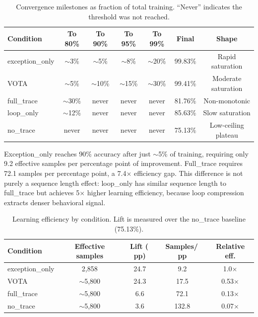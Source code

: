 \documentclass[11pt,a4paper]{article}
\newcommand{\pp}{\,pp}
\begin{document}
\begin{table}[t]
\centering
\caption{Convergence milestones as fraction of total training. ``Never'' indicates the threshold was not reached.}
\label{tab:dynamics}
\small
\begin{tabular}{@{}lcccccc@{}}
\toprule
Condition & To 80\% & To 90\% & To 95\% & To 99\% & Final & Shape \\
\midrule
exception\_only & $\sim$3\% & $\sim$5\% & $\sim$8\%  & $\sim$20\% & 99.83\% & Rapid saturation \\
VOTA            & $\sim$5\% & $\sim$10\% & $\sim$15\% & $\sim$30\% & 99.41\% & Moderate saturation \\
full\_trace     & $\sim$30\% & never & never & never & 81.76\% & Non-monotonic \\
loop\_only      & $\sim$12\% & never & never & never & 85.63\% & Slow saturation \\
no\_trace       & never & never & never & never & 75.13\% & Low-ceiling plateau \\
\bottomrule
\end{tabular}
\end{table}

Exception\_only reaches 90\% accuracy after just $\sim$5\% of training, requiring only 9.2 effective samples per percentage point of improvement. Full\_trace requires 72.1 samples per percentage point, a 7.4$\times$ efficiency gap. This difference is not purely a sequence length effect: loop\_only has similar sequence length to full\_trace but achieves 5$\times$ higher learning efficiency, because loop compression extracts denser behavioral signal.

\begin{table}[t]
\centering
\caption{Learning efficiency by condition. Lift is measured over the no\_trace baseline (75.13\%).}
\label{tab:efficiency}
\small
\begin{tabular}{@{}lcccc@{}}
\toprule
Condition & Effective samples & Lift (\pp) & Samples/\pp & Relative eff. \\
\midrule
exception\_only & 2,858  & 24.7 & 9.2   & 1.0$\times$ \\
VOTA            & $\sim$5,800 & 24.3 & 17.5  & 0.53$\times$ \\
full\_trace     & $\sim$5,800 & 6.6  & 72.1  & 0.13$\times$ \\
no\_trace       & $\sim$5,800 & 3.6  & 132.8 & 0.07$\times$ \\
\bottomrule
\end{tabular}
\end{table}
\end{document}

